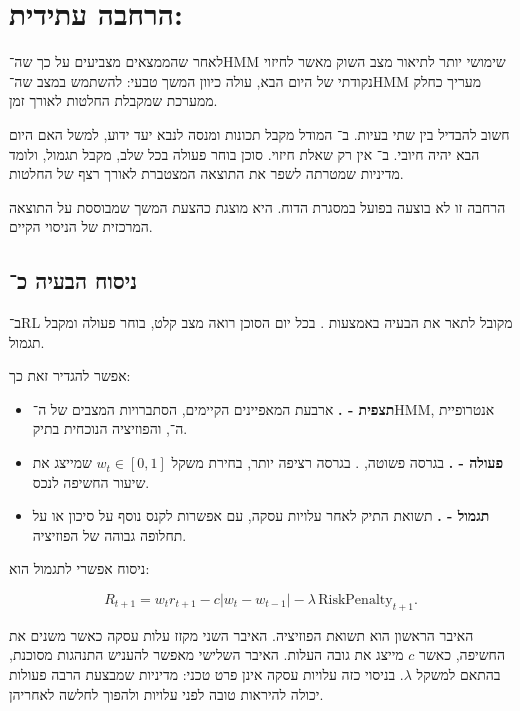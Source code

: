 \section{הרחבה עתידית: }

לאחר שהממצאים מצביעים על כך שה־HMM שימושי יותר לתיאור מצב השוק מאשר לחיזוי נקודתי של היום הבא, עולה כיוון המשך טבעי: להשתמש במצב שה־HMM מעריך כחלק ממערכת שמקבלת החלטות לאורך זמן.

חשוב להבדיל בין שתי בעיות. ב־ המודל מקבל תכונות ומנסה לנבא יעד ידוע, למשל האם היום הבא יהיה חיובי. ב־ אין רק שאלת חיזוי. סוכן בוחר פעולה בכל שלב, מקבל תגמול, ולומד מדיניות שמטרתה לשפר את התוצאה המצטברת לאורך רצף של החלטות.

הרחבה זו לא בוצעה בפועל במסגרת הדוח. היא מוצגת כהצעת המשך שמבוססת על התוצאה המרכזית של הניסוי הקיים.

\subsection{ניסוח הבעיה כ־}

ב־RL מקובל לתאר את הבעיה באמצעות . בכל יום הסוכן רואה מצב קלט, בוחר פעולה ומקבל תגמול.

אפשר להגדיר זאת כך:

\begin{itemize}
    \item \textbf{תצפית - .} ארבעת המאפיינים הקיימים, הסתברויות המצבים של ה־HMM, אנטרופיית ה־, והפוזיציה הנוכחית בתיק.
    \item \textbf{פעולה - .} בגרסה פשוטה, . בגרסה רציפה יותר, בחירת משקל \(w_t\in[0,1]\) שמייצג את שיעור החשיפה לנכס.
    \item \textbf{תגמול - .} תשואת התיק לאחר עלויות עסקה, עם אפשרות לקנס נוסף על סיכון או על תחלופה גבוהה של הפוזיציה.
\end{itemize}

ניסוח אפשרי לתגמול הוא:

\begin{equation}
R_{t+1}=w_t r_{t+1}-c\lvert w_t-w_{t-1}\rvert-\lambda\,\mathrm{RiskPenalty}_{t+1}.
\end{equation}

האיבר הראשון הוא תשואת הפוזיציה. האיבר השני מקזז עלות עסקה כאשר משנים את החשיפה, כאשר \(c\) מייצג את גובה העלות. האיבר השלישי מאפשר להעניש התנהגות מסוכנת, בהתאם למשקל \(\lambda\). בניסוי כזה עלויות עסקה אינן פרט טכני: מדיניות שמבצעת הרבה פעולות יכולה להיראות טובה לפני עלויות ולהפוך לחלשה לאחריהן.

